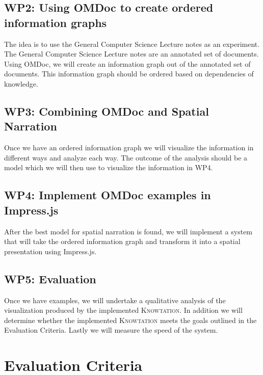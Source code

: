 \documentclass[twoside]{article}
\newcommand{\sys}{\textsc{Knowtation}\xspace}
\begin{document}
\subsection{WP2: Using OMDoc to create ordered information graphs}
The idea is to use the General Computer Science Lecture notes \cite{Kohlhase:GenCSI:base} as an experiment. The General Computer Science Lecture notes are an annotated set of documents. Using OMDoc, we will create an information graph out of the annotated set of documents. This information graph should be ordered based on dependencies of knowledge.\\



\subsection{WP3: Combining OMDoc and Spatial Narration}
Once we have an ordered information graph we will visualize the information in different ways and analyze each way. The outcome of the analysis should be a model which we will then use to visualize the information in WP4.\\

\subsection{WP4: Implement OMDoc examples in Impress.js}
After the best model for spatial narration is found, we will implement a system that will take the ordered information graph and transform it into a spatial presentation using Impress.js.

\subsection{WP5: Evaluation}
Once we have examples, we will undertake a qualitative analysis of the visualization produced by the implemented \sys . In addition we will determine whether the implemented \sys meets the goals outlined in the Evaluation Criteria. Lastly we will measure the speed of the system.

\section{Evaluation Criteria}
\end{document}
